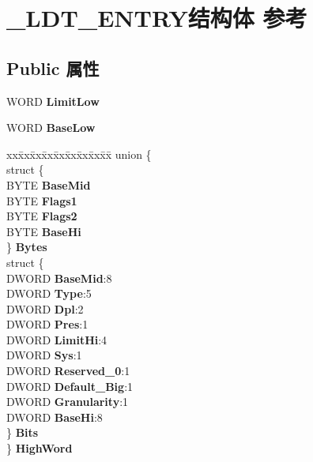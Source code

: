 \hypertarget{struct___l_d_t___e_n_t_r_y}{}\section{\+\_\+\+L\+D\+T\+\_\+\+E\+N\+T\+R\+Y结构体 参考}
\label{struct___l_d_t___e_n_t_r_y}
\subsection*{Public 属性}
\begin{DoxyCompactItemize}
\item 
\mbox{\label{struct___l_d_t___e_n_t_r_y_a269d06e61f04f5e63d0d52be59a2654b}} 
W\+O\+RD {\bfseries Limit\+Low}
\item 
\mbox{\label{struct___l_d_t___e_n_t_r_y_a9b7103e7d7ee8f9988edcd5a12f8852a}} 
W\+O\+RD {\bfseries Base\+Low}
\item 
\mbox{\label{struct___l_d_t___e_n_t_r_y_a4dad24fbf5596c799a99e596a44af1aa}} 
\begin{tabbing}
xx\=xx\=xx\=xx\=xx\=xx\=xx\=xx\=xx\=\kill
union \{\\
\>struct \{\\
\>\>BYTE {\bfseries BaseMid}\\
\>\>BYTE {\bfseries Flags1}\\
\>\>BYTE {\bfseries Flags2}\\
\>\>BYTE {\bfseries BaseHi}\\
\>\} {\bfseries Bytes}\\
\>struct \{\\
\>\>DWORD {\bfseries BaseMid}:8\\
\>\>DWORD {\bfseries Type}:5\\
\>\>DWORD {\bfseries Dpl}:2\\
\>\>DWORD {\bfseries Pres}:1\\
\>\>DWORD {\bfseries LimitHi}:4\\
\>\>DWORD {\bfseries Sys}:1\\
\>\>DWORD {\bfseries Reserved\_0}:1\\
\>\>DWORD {\bfseries Default\_Big}:1\\
\>\>DWORD {\bfseries Granularity}:1\\
\>\>DWORD {\bfseries BaseHi}:8\\
\>\} {\bfseries Bits}\\
\} {\bfseries HighWord}\\


\end{tabbing}
\end{DoxyCompactItemize}
